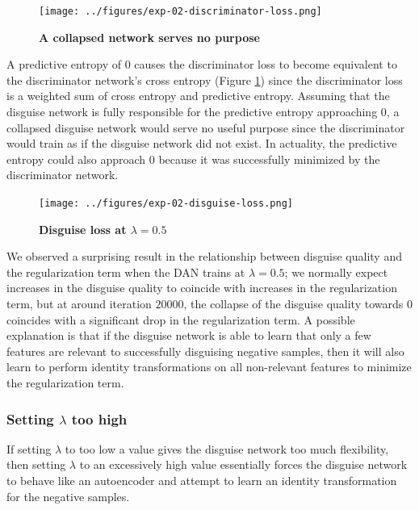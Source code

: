 \documentclass{proc}
\begin{document}
\begin{figure}[h!]
		\texttt{[image: ../figures/exp-02-discriminator-loss.png]}
		\caption{\textbf{A collapsed network serves no purpose}}
		\label{fig:exp-02-discriminator-loss}
\end{figure}

A predictive entropy of $0$ causes the discriminator loss to become equivalent to the discriminator network's cross entropy (Figure \ref{fig:exp-02-discriminator-loss}) since the discriminator loss is a weighted sum of cross entropy and predictive entropy. Assuming that the disguise network is fully responsible for the predictive entropy approaching $0$, a collapsed disguise network would serve no useful purpose since the discriminator would train as if the disguise network did not exist. In actuality, the predictive entropy could also approach $0$ because it was successfully minimized by the discriminator network.

\begin{figure}[h!]
		\texttt{[image: ../figures/exp-02-disguise-loss.png]}
		\caption{\textbf{Disguise loss at $\lambda = 0.5$}}
		\label{fig:exp-02-disguise-loss}
\end{figure}

We observed a surprising result in the relationship between disguise quality and the regularization term when the DAN trains at $\lambda = 0.5$; we normally expect increases in the disguise quality to coincide with increases in the regularization term, but at around iteration $20000$, the collapse of the disguise quality towards $0$ coincides with a significant drop in the regularization term. A possible explanation is that if the disguise network is able to learn that only a few features are relevant to successfully disguising negative samples, then it will also learn to perform identity transformations on all non-relevant features to minimize the regularization term.

\subsubsection{Setting $\lambda$ too high}

If setting $\lambda$ to too low a value gives the disguise network too much flexibility, then setting $\lambda$ to an excessively high value essentially forces the disguise network to behave like an autoencoder and attempt to learn an identity transformation for the negative samples.
\end{document}
